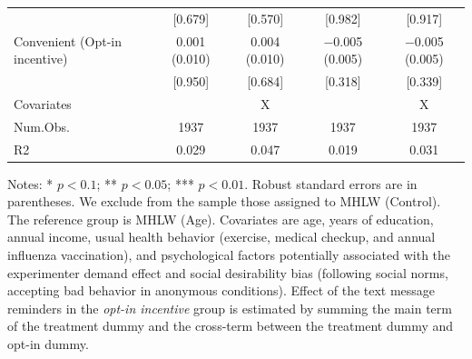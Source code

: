 \documentclass[
    a4paper
]{article}
\begin{document}
\begin{table}
\begin{threeparttable}
\begin{tabular}[t]{lcccc}
\hspace{1em} & {}[\num{0.679}] & {}[\num{0.570}] & {}[\num{0.982}] & {}[\num{0.917}]\\
\hspace{1em}Convenient (Opt-in incentive) & \num{0.001} (\num{0.010}) & \num{0.004} (\num{0.010}) & \num{-0.005} (\num{0.005}) & \num{-0.005} (\num{0.005})\\
\hspace{1em} & {}[\num{0.950}] & {}[\num{0.684}] & {}[\num{0.318}] & {}[\num{0.339}]\\
\midrule
Covariates &  & X &  & X\\
Num.Obs. & \num{1937} & \num{1937} & \num{1937} & \num{1937}\\
R2 & \num{0.029} & \num{0.047} & \num{0.019} & \num{0.031}\\
\bottomrule
\end{tabular}
\begin{tablenotes}
\item Notes: * $p < 0.1$; ** $p < 0.05$; *** $p < 0.01$. Robust standard errors are in parentheses. We exclude from the sample those assigned to MHLW (Control). The reference group is MHLW (Age). Covariates are age, years of education, annual income, usual health behavior (exercise, medical checkup, and annual influenza vaccination), and psychological factors potentially associated with the experimenter demand effect and social desirability bias (following social norms, accepting bad behavior in anonymous conditions). Effect of the text message reminders in the \emph{opt-in incentive} group is estimated by summing the main term of the treatment dummy and the cross-term between the treatment dummy and opt-in dummy.
\end{tablenotes}
\end{threeparttable}
\end{table}
\end{document}
